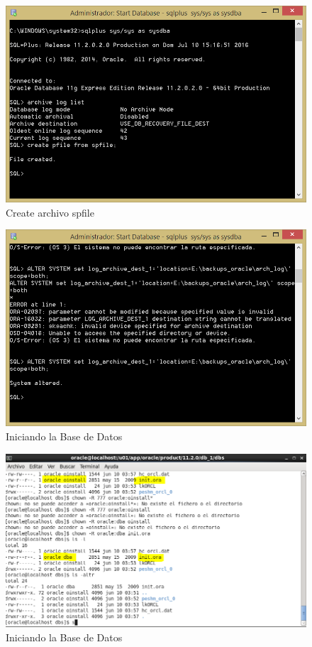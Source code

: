 \begin{figure}[h]
\centering
\includegraphics[scale=1.7]{../images/spfile.png}
\caption{Create archivo spfile}
\label{fig:spfile}
\end{figure}

\begin{figure}[h]
\centering
\includegraphics[scale=1.7]{../images/startdb.png}
\caption{Iniciando la Base de Datos}
\label{fig:startdb}
\end{figure}

\begin{figure}[h]
\centering
\includegraphics[scale=1.7]{../images/linux.png}
\caption{Iniciando la Base de Datos}
\label{fig:linux}
\end{figure}



